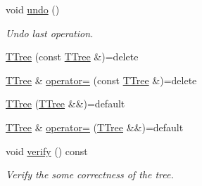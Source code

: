 \begin{DoxyCompactItemize}
void \hyperlink{classTTree_a14286d0dba4bda295b7a73ebefbf1bcf}{undo} ()
\begin{DoxyCompactList}\small\item\em Undo last operation. \end{DoxyCompactList}\item 
\hyperlink{classTTree_ad7fb8543e084eea4a24571f3cb979555}{T\+Tree} (const \hyperlink{classTTree}{T\+Tree} \&)=delete
\item 
\hyperlink{classTTree}{T\+Tree} \& \hyperlink{classTTree_a3c4da2361311ac5903822a2151865ae6}{operator=} (const \hyperlink{classTTree}{T\+Tree} \&)=delete
\item 
\hyperlink{classTTree_acfa1c1f035255298fd22be8810d5d672}{T\+Tree} (\hyperlink{classTTree}{T\+Tree} \&\&)=default
\item 
\hyperlink{classTTree}{T\+Tree} \& \hyperlink{classTTree_a8751a54d1c80d2f822d84a98e5c96293}{operator=} (\hyperlink{classTTree}{T\+Tree} \&\&)=default
\item 
void \hyperlink{classTTree_a561ca642fa6104a2275c30974b57e221}{verify} () const 
\begin{DoxyCompactList}\small\item\em Verify the some correctness of the tree. \end{DoxyCompactList}\end{DoxyCompactItemize}
